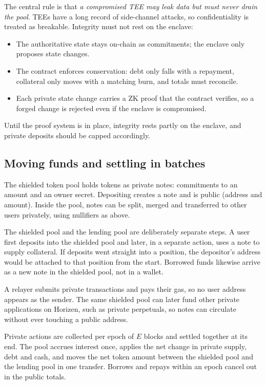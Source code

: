 \documentclass[11pt,a4paper]{article}
\begin{document}
The central rule is that \emph{a compromised TEE may leak data but must never drain the pool}. TEEs have a long
record of side-channel attacks, so confidentiality is treated as breakable. Integrity must not rest on the
enclave:
\begin{itemize}
  \item The authoritative state stays on-chain as commitments; the enclave only proposes state changes.
  \item The contract enforces conservation: debt only falls with a repayment, collateral only moves with a
        matching burn, and totals must reconcile.
  \item Each private state change carries a ZK proof that the contract verifies, so a forged change is rejected
        even if the enclave is compromised.
\end{itemize}
Until the proof system is in place, integrity rests partly on the enclave, and private deposits should be capped
accordingly.

\subsection{Moving funds and settling in batches}
\label{sec:batch}

The shielded token pool holds tokens as private notes: commitments to an amount and an owner secret. Depositing
creates a note and is public (address and amount). Inside the pool, notes can be split, merged and transferred to
other users privately, using nullifiers as above.

The shielded pool and the lending pool are deliberately separate steps. A user first deposits into the shielded
pool and later, in a separate action, uses a note to supply collateral. If deposits went straight into a
position, the depositor's address would be attached to that position from the start. Borrowed funds likewise
arrive as a new note in the shielded pool, not in a wallet.

A relayer submits private transactions and pays their gas, so no user address appears as the sender. The same
shielded pool can later fund other private applications on Horizen, such as private perpetuals, so notes can
circulate without ever touching a public address.

Private actions are collected per epoch of $E$ blocks and settled together at its end. The pool accrues interest
once, applies the net change in private supply, debt and cash, and moves the net token amount between the
shielded pool and the lending pool in one transfer. Borrows and repays within an epoch cancel out in the public
totals.
\end{document}

